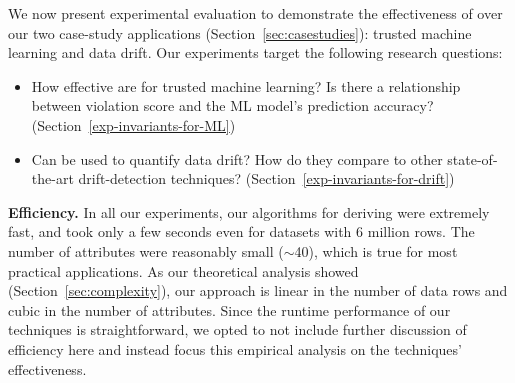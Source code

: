 
\newcommand{\ut}{untrustworthy\xspace}
\newcommand{\Ut}{Untrustworthy\xspace}



We now present experimental evaluation to demonstrate the effectiveness of \dis over our two case-study applications
(Section~\ref{sec:casestudies}): trusted machine learning and data drift.
Our experiments target the following research questions:     

\begin{itemize}
    \item How effective are \dis for trusted machine learning?
    Is there a relationship between \invariant violation score and the ML model's
    prediction accuracy? (Section~\ref{exp-invariants-for-ML})

    \item Can \dis be used to quantify data drift? How do they
    compare to other state-of-the-art drift-detection techniques?
    (Section~\ref{exp-invariants-for-drift})
    


\end{itemize}

%

\smallskip \noindent\textbf{Efficiency.} In all our experiments, our algorithms
for deriving \dis were extremely fast, and took only a few seconds even for
datasets with 6 million rows. The number of attributes were reasonably small
($\sim$40), which is true for most practical applications. As our theoretical
analysis showed (Section~\ref{sec:complexity}), our approach is linear in
the number of data rows and cubic in the number of attributes. Since the runtime
performance of our techniques is straightforward, we opted to not include
further discussion of efficiency here and instead focus this empirical analysis
on the techniques' effectiveness.


